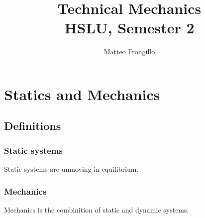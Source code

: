 \documentclass{article}
\title{\textbf{Technical Mechanics \\ HSLU, Semester 2}}
\author{Matteo Frongillo}
\date{}
\begin{document}
\maketitle
\tableofcontents
\pagebreak

\section{Statics and Mechanics}
\subsection{Definitions}
\subsubsection{Static systems}
Static systems are unmoving in equilibrium.

\subsubsection{Mechanics}
Mechanics is the combinition of static and dynamic systems.
\end{document}
